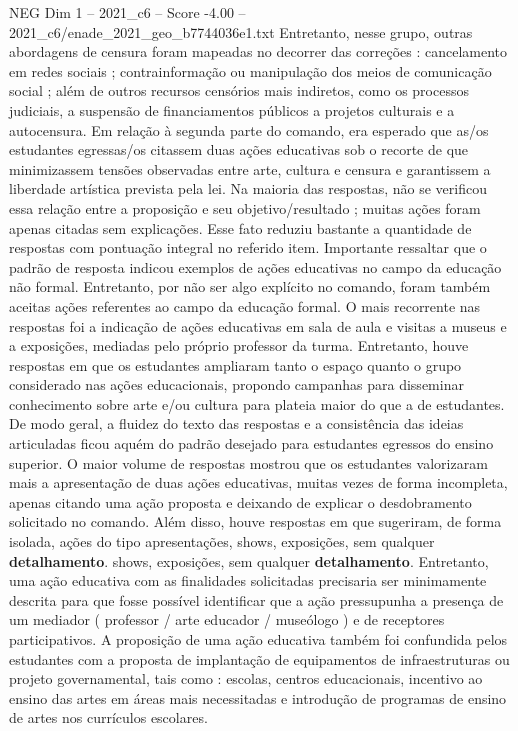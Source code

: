 \begin{textsample}{NEG Dim 1 – 2021\_c6 – Score -4.00 – 2021\_c6/enade\_2021\_geo\_b7744036e1.txt}
Entretanto, nesse grupo, outras abordagens de censura foram mapeadas no decorrer das correções : cancelamento em redes sociais ; contrainformação ou manipulação dos meios de comunicação social ; além de outros recursos censórios mais indiretos, como os processos judiciais, a suspensão de financiamentos públicos a projetos culturais e a autocensura.
Em relação à segunda parte do comando, era esperado que as/os estudantes egressas/os citassem duas ações educativas sob o recorte de que minimizassem tensões observadas entre arte, cultura e censura e garantissem a liberdade artística prevista pela lei.
Na maioria das respostas, não se verificou essa relação entre a proposição e seu objetivo/resultado ; muitas ações foram apenas citadas sem explicações.
Esse fato reduziu bastante a quantidade de respostas com pontuação integral no referido item.
Importante ressaltar que o padrão de resposta indicou exemplos de ações educativas no campo da educação não formal.
Entretanto, por não ser algo explícito no comando, foram também aceitas ações referentes ao campo da educação formal.
O mais recorrente nas respostas foi a indicação de ações educativas em sala de aula e visitas a museus e a exposições, mediadas pelo próprio professor da turma.
Entretanto, houve respostas em que os estudantes ampliaram tanto o espaço quanto o grupo considerado nas ações educacionais, propondo campanhas para disseminar conhecimento sobre arte e/ou cultura para plateia maior do que a de estudantes.
De modo geral, a fluidez do texto das respostas e a consistência das ideias articuladas ficou aquém do padrão desejado para estudantes egressos do ensino superior.
O maior volume de respostas mostrou que os estudantes valorizaram mais a apresentação de duas ações educativas, muitas vezes de forma incompleta, apenas citando uma ação proposta e deixando de explicar o desdobramento solicitado no comando.
Além disso, houve respostas em que sugeriram, de forma isolada, ações do tipo apresentações, shows, exposições, sem qualquer \textbf{detalhamento}. shows, exposições, sem qualquer \textbf{detalhamento}.
Entretanto, uma ação educativa com as finalidades solicitadas precisaria ser minimamente descrita para que fosse possível identificar que a ação pressupunha a presença de um mediador ( professor / arte educador / museólogo ) e de receptores participativos.
A proposição de uma ação educativa também foi confundida pelos estudantes com a proposta de implantação de equipamentos de infraestruturas ou projeto governamental, tais como : escolas, centros educacionais, incentivo ao ensino das artes em áreas mais necessitadas e introdução de programas de ensino de artes nos currículos escolares.

\end{textsample}

